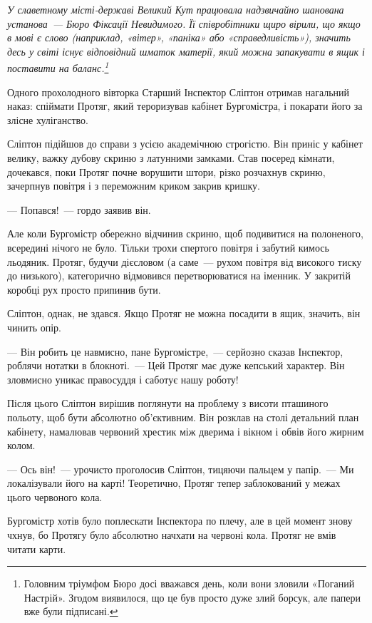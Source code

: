 \documentclass[12pt, a4paper, openany]{book}
\begin{document}
\begin{terrybox}
\textit{У славетному місті-державі Великий Кут працювала надзвичайно шанована установа~--- Бюро Фіксації Невидимого. Її співробітники щиро вірили, що якщо в мові є слово (наприклад, «вітер», «паніка» або «справедливість»), значить десь у світі існує відповідний шматок матерії, який можна запакувати в ящик і поставити на баланс.\footnote{Головним тріумфом Бюро досі вважався день, коли вони зловили «Поганий Настрій». Згодом виявилося, що це був просто дуже злий борсук, але папери вже були підписані.}}

\medskip
Одного прохолодного вівторка Старший Інспектор Сліптон отримав нагальний наказ: спіймати Протяг, який тероризував кабінет Бургомістра, і покарати його за злісне хуліганство.

Сліптон підійшов до справи з усією академічною строгістю. Він приніс у кабінет велику, важку дубову скриню з латунними замками. Став посеред кімнати, дочекався, поки Протяг почне ворушити штори, різко розчахнув скриню, зачерпнув повітря і з переможним криком закрив кришку.

\medskip
--- Попався!~--- гордо заявив він.

\medskip
Але коли Бургомістр обережно відчинив скриню, щоб подивитися на полоненого, всередині нічого не було. Тільки трохи спертого повітря і забутий кимось льодяник. Протяг, будучи дієсловом (а саме~--- рухом повітря від високого тиску до низького), категорично відмовився перетворюватися на іменник. У закритій коробці рух просто припинив бути.

Сліптон, однак, не здався. Якщо Протяг не можна посадити в ящик, значить, він чинить опір.

\medskip
--- Він робить це навмисно, пане Бургомістре,~--- серйозно сказав Інспектор, роблячи нотатки в блокноті.~--- Цей Протяг має дуже кепський характер. Він зловмисно уникає правосуддя і саботує нашу роботу!

\medskip
Після цього Сліптон вирішив поглянути на проблему з висоти пташиного польоту, щоб бути абсолютно об'єктивним. Він розклав на столі детальний план кабінету, намалював червоний хрестик між дверима і вікном і обвів його жирним колом.

\medskip
--- Ось він!~--- урочисто проголосив Сліптон, тицяючи пальцем у папір.~--- Ми локалізували його на карті! Теоретично, Протяг тепер заблокований у межах цього червоного кола.

\medskip
Бургомістр хотів було поплескати Інспектора по плечу, але в цей момент знову чхнув, бо Протягу було абсолютно начхати на червоні кола. Протяг не вмів читати карти.


\end{terrybox}
\end{document}
